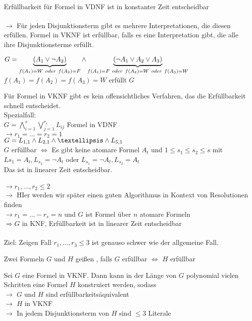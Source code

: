 \noindent\\
Erfüllbarkeit für Formel in VDNF ist in konstanter Zeit entscheidbar\\

\noindent\\
$\rightarrow$ Für jeden Disjunktionsterm gibt es mehrere Interpretationen, die diesen erfüllen. Formel in VKNF ist erfüllbar, falls es eine Interpretation gibt, die alle ihre Disjunktionsterme erfüllt.

\beispiel{}
$G = \underbrace{ (A_1 \vee \neg A_2) }_{f(A_1) = W \ oder \ f(A_2) = F} \wedge \underbrace{ ( \neg A_1 \vee A_2 \vee A_3) }_{f(A_1) = F\ oder\ f(A_2)=W\ oder\ f(A_3) = W}$\\
$f(A_1) = f(A_2) = f(A_3) = W$ erfüllt $G$

\bemerkung{}
Für Formel in VKNF gibt es kein offensichtliches Verfahren, das die Erfüllbarkeit schnell entscheidet.\\
Spezialfall:\\
$G = \bigwedge_{i=1}^s \bigvee_{j=1}^{r_i} L_{ij}$ Formel in VDNF\\
$\rightarrow r_1 = … = r_2 = 1$\\
$G = L_{1,1} \AND L_{2,1} \AND … \AND L_{5,1}$\\
$G$ erfüllbar $\Leftrightarrow$ Es gibt keine atomare Formel $A_t$ und $1 \leq s_1 \leq s_2 \leq s$ mit $L{s_1} = A_t, L_{s_2} = \neg A_t$ oder $L_{s_1} = \neg A_t, L_{s_2} = A_t$\\
Das ist in linearer Zeit entscheidbar.\\

\noindent\\
$\rightarrow r_1, …, r_2 \leq 2$\\
$\rightarrow$ HIer werden wir später einen guten Algorithmus in Kontext von Resolutionen finden\\
$\rightarrow r_1 = … - r_s = n$ und $G$ ist Formel über $n$ atomare Formeln\\
$\Rightarrow G$ in KNF, Erfüllbarkeit ist in linearer Zeit entscheidbar\\

\noindent\\
Ziel: Zeigen Fall $r_1, …, r_3 \leq 3$ ist genauso schwer wie der allgemeine Fall.

Zwei Formeln $G$ und $H$ geißen , falls $G$ erfüllbar $\Leftrightarrow$ $H$ erfüllbar

Sei $G$ eine Formel in VKNF. Dann kann in der Länge von $G$ polynomial vielen Schritten eine Formel $H$ konstruiert werden, sodass \\
$\rightarrow$ $G$ und $H$ sind erfüllbarkeitsäquivalent\\
$\rightarrow$ $H$ in VKNF\\
$\rightarrow$ In jedem Disjunktionsterm von $H$ sind $\leq 3$ Literale


